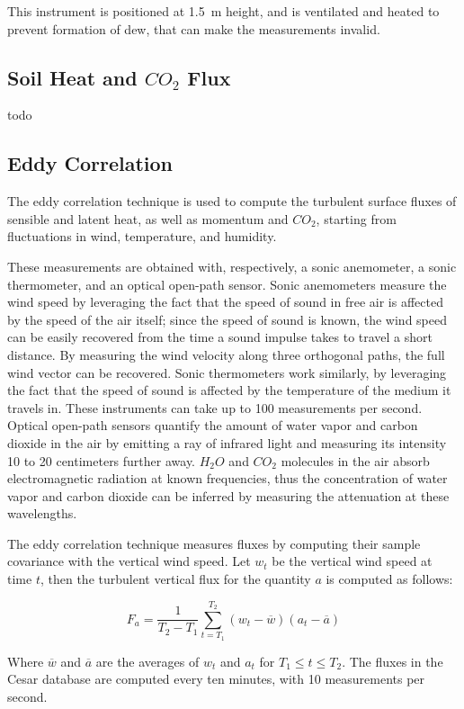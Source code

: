 \documentclass[12pt]{book}
\begin{document}
This instrument is positioned at \SI{1.5}{\meter} height, and is ventilated and heated to prevent formation of dew, that can make the measurements invalid.

\subsection{Soil Heat and $CO_2$ Flux}
todo


\subsection{Eddy Correlation}
\label{sec:eddy_correlation}
The eddy correlation technique is used to compute the turbulent surface fluxes of sensible and latent heat, as well as momentum and $CO_2$, starting from fluctuations in wind, temperature, and humidity.

These measurements are obtained with, respectively, a sonic anemometer, a sonic thermometer, and an optical open-path sensor. Sonic anemometers measure the wind speed by leveraging the fact that the speed of sound in free air is affected by the speed of the air itself; since the speed of sound is known, the wind speed can be easily recovered from the time a sound impulse takes to travel a short distance. By measuring the wind velocity along three orthogonal paths, the full wind vector can be recovered. Sonic thermometers work similarly, by leveraging the fact that the speed of sound is affected by the temperature of the medium it travels in. These instruments can take up to 100 measurements per second. Optical open-path sensors quantify the amount of water vapor and carbon dioxide in the air by emitting a ray of infrared light and measuring its intensity 10 to 20 centimeters further away. $H_2O$ and $CO_2$ molecules in the air absorb electromagnetic radiation at known frequencies, thus the concentration of water vapor and carbon dioxide can be inferred by measuring the attenuation at these wavelengths.

The eddy correlation technique measures fluxes by computing their sample covariance with the vertical wind speed. Let $w_t$ be the vertical wind speed at time $t$, then the turbulent vertical flux for the quantity $a$ is computed as follows:

$$
F_a=\frac{1}{T_2-T_1}\sum_{t=T_1}^{T_2}(w_t-\overline{w})(a_t-\overline{a})
$$

Where $\overline{w}$ and $\overline{a}$ are the averages of $w_t$ and $a_t$ for $T_1\leq t\leq T_2$. The fluxes in the Cesar database are computed every ten minutes, with 10 measurements per second.
\end{document}

